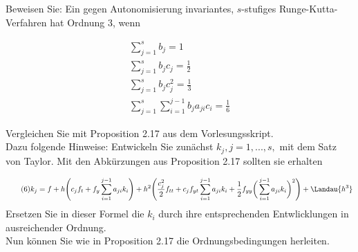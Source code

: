 \begin{exercise}

Beweisen Sie: Ein gegen Autonomisierung invariantes, $s$-stufiges Runge-Kutta-Verfahren
hat Ordnung 3, wenn

\begin{align} \label{Sum_b} \tag{5a}
  \sum_{j=1}^s b_j = 1 \\
  \label{Sum_b_c} \tag{5b}
  \sum_{j=1}^s b_j c_j = \frac{1}{2} \\
 \label{Sum_b_c_squared} \tag{5c}
  \sum_{j=1}^s b_j c_j^2 = \frac{1}{3}\\
  \label{Sum_b_c_a} \tag{5d}
  \sum_{j=1}^s \sum_{i=1}^{j-1} b_j a_{ji} c_i = \frac{1}{6}
\end{align}

Vergleichen Sie mit Proposition 2.17 aus dem Vorlesungsskript. \\

Dazu folgende Hinweise: Entwickeln Sie zunächst $k_j, j=1,...,s,$ mit dem
Satz von Taylor. Mit den Abkürzungen aus Proposition 2.17 sollten sie erhalten

\begin{align} \label{long_k} \tag{6}
  k_j=f+h\Bigg( c_jf_t+f_y\sum_{i=1}^{j-1}a_{ji}k_i \Bigg)
  + h^2 \Bigg( \frac{c_j^2}{2}f_{tt}+c_j f_{yt}\sum_{i=1}^{j-1}a_{ji}k_i
  + \frac{1}{2} f_{yy} \bigg( \sum_{i=1}^{j-1}a_{ji}k_i \bigg)^2 \Bigg)
  + \Landau{h^3}
\end{align}
Ersetzen Sie in dieser Formel die $k_i$ durch ihre entsprechenden Entwlicklungen
in ausreichender Ordnung. \\
Nun können Sie wie in Proposition 2.17 die Ordnungsbedingungen herleiten.
\end{exercise}

